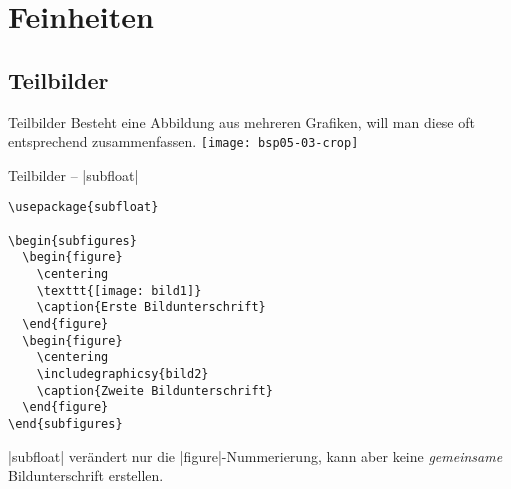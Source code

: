 \documentclass{beamer}
\begin{document}
\begin{frame}[fragile]{\TikZ}
\begin{LTXexample}[pos=b]
\end{LTXexample}
\end{frame}



\section{Feinheiten}
\subsection{Teilbilder}
\begin{frame}{Teilbilder}
Besteht eine Abbildung aus mehreren Grafiken, will man diese oft entsprechend zusammenfassen. \vfill
\centering
\texttt{[image: bsp05-03-crop]}
\end{frame}

\begin{frame}[fragile]{Teilbilder – |subfloat|}
\begin{lstlisting}
\usepackage{subfloat}

\begin{subfigures}
  \begin{figure}
    \centering
    \texttt{[image: bild1]}
    \caption{Erste Bildunterschrift}
  \end{figure}
  \begin{figure}
    \centering
    \includegraphicsy{bild2}
    \caption{Zweite Bildunterschrift}
  \end{figure}
\end{subfigures}
\end{lstlisting}
|subfloat| verändert nur die |figure|-Nummerierung, kann aber keine \emph{gemeinsame} Bildunterschrift erstellen.
\end{frame}
\end{document}
